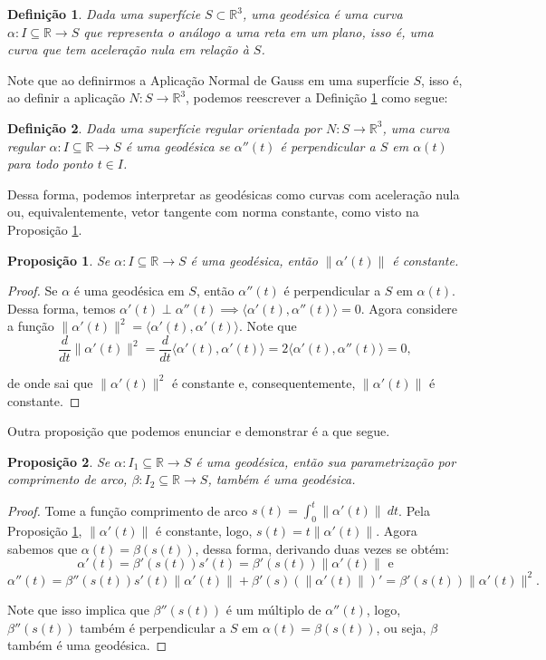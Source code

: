 \documentclass{article}
\newtheorem{definition}{Definição}
\newtheorem{proposition}{Proposição}
\begin{document}
\begin{definition}
    \label{def1}
    Dada uma superfície $S\subset \mathbb{R}^3$, uma geodésica é uma curva $\alpha : I\subseteq\mathbb{R}\to S$ que representa o análogo a uma reta em um plano, isso é, uma curva que tem aceleração nula em relação à $S$.
\end{definition}

Note que ao definirmos a Aplicação Normal de Gauss em uma superfície $S$, isso é, ao definir a aplicação $N : S\to \mathbb{R}^3$, podemos reescrever a Definição \ref{def1} como segue:
\begin{definition}
    \label{def2}
    Dada uma superfície regular orientada por $N : S\to \mathbb{R}^3$, uma curva regular $\alpha : I\subseteq\mathbb{R}\to S$ é uma geodésica se $\alpha''(t)$ é perpendicular a $S$ em $\alpha(t)$ para todo ponto $t\in I$.
\end{definition}

Dessa forma, podemos interpretar as geodésicas como curvas com aceleração nula ou, equivalentemente, vetor tangente com norma constante, como visto na Proposição \ref{prop1}.
\begin{proposition}
    \label{prop1}
    Se $\alpha : I\subseteq\mathbb{R}\to S$ é uma geodésica, então $\|\alpha'(t)\|$ é constante.
\end{proposition}
\begin{proof}
    Se $\alpha$ é uma geodésica em $S$, então $\alpha''(t)$ é perpendicular a $S$ em $\alpha(t)$. Dessa forma, temos $\alpha'(t)\perp \alpha''(t)\implies \langle \alpha'(t), \alpha''(t)\rangle = 0$. Agora considere a função $\|\alpha'(t)\|^2 = \langle \alpha'(t), \alpha'(t)\rangle$. Note que
    \[\dfrac{d}{dt}\|\alpha'(t)\|^2 = \dfrac{d}{dt}\langle \alpha'(t), \alpha'(t)\rangle = 2\langle \alpha'(t), \alpha''(t)\rangle = 0,\]
    
    \noindent de onde sai que $\|\alpha'(t)\|^2$ é constante e, consequentemente, $\|\alpha'(t)\|$ é constante.
\end{proof}

Outra proposição que podemos enunciar e demonstrar é a que segue.
\begin{proposition}
    \label{prop2}
    Se $\alpha : I_1\subseteq\mathbb{R}\to S$ é uma geodésica, então sua parametrização por comprimento de arco, $\beta : I_2\subseteq\mathbb{R}\to S$, também é uma geodésica.
\end{proposition}
\begin{proof}
    Tome a função comprimento de arco $s(t) = \int_0^t \|\alpha'(t)\| ~dt$. Pela Proposição \ref{prop1}, $\|\alpha'(t)\|$ é constante, logo, $s(t) = t\|\alpha'(t)\|$. Agora sabemos que $\alpha(t) = \beta(s(t))$, dessa forma, derivando duas vezes se obtém:
    \[\alpha'(t) = \beta'(s(t))s'(t) = \beta'(s(t))\|\alpha'(t)\| \text{ e}\]
    \[\alpha''(t) = \beta''(s(t))s'(t)\|\alpha'(t)\| + \beta'(s)\left(\|\alpha'(t)\|\right)' = \beta'(s(t))\|\alpha'(t)\|^2.\]
    
    Note que isso implica que $\beta''(s(t))$ é um múltiplo de $\alpha''(t)$, logo, $\beta''(s(t))$ também é perpendicular a $S$ em $\alpha(t) = \beta(s(t))$, ou seja, $\beta$ também é uma geodésica.
\end{proof}
\end{document}
